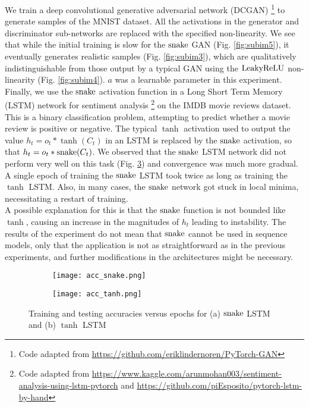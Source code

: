 We train a deep convolutional generative adversarial network (DCGAN) \footnote{Code adapted from \url{https://github.com/eriklindernoren/PyTorch-GAN}} \cite{radford2016unsupervised} to generate samples of the MNIST dataset. All the activations in the generator and discriminator sub-networks are replaced with the specified non-linearity. We see that while the initial training is slow for the $ \operatorname{snake} $ GAN (Fig. \ref{fig:subim5}), it eventually generates realistic samples (Fig. \ref{fig:subim3}), which are qualitatively indistinguishable from those output by a typical GAN using the $ \operatorname{LeakyReLU} $ non-linearity (Fig. \ref{fig:subim4}). $a$ was a learnable parameter in this experiment. \\

Finally, we use the $ \operatorname{snake} $ activation function in a Long Short Term Memory (LSTM) network for sentiment analysis 
\footnote{Code adapted from \url{https://www.kaggle.com/arunmohan003/sentiment-analysis-using-lstm-pytorch} and \url{https://github.com/piEsposito/pytorch-lstm-by-hand}} 
on the IMDB movie reviews dataset. 
This is a binary classification problem, attempting to predict whether a movie review is positive or negative. The typical $ \tanh $ activation used to output the value $ h_{t} = o_{t} * \tanh(C_t) $ in an LSTM is replaced by the $ \operatorname{snake} $ activation, so that $h_{t} = o_{t} * \operatorname{snake}(C_{t})$. 
We observed that the $ \operatorname{snake} $ LSTM network did not perform very well on this task (Fig. \ref{fig:lstm_acc}) and convergence was much more gradual. A single epoch of training the $ \operatorname{snake} $ LSTM took twice as long as training the $ \tanh $ LSTM.  Also, in many cases, the $ \operatorname{snake} $ network got stuck in local minima, necessitating a restart of training. \\

A possible explanation for this is that the $ \operatorname{snake} $ function is not bounded like $ \tanh $, causing an increase in the magnitudes of $ h_{t} $ leading to instability. The results of the experiment do not mean that $ \operatorname{snake} $ cannot be used in sequence models, only that the application is not as straightforward as in the previous experiments, and further modifications in the architectures might be necessary. 

\begin{figure}[h]
  \centering
  \begin{subfigure}{0.45\textwidth}
    \centering
    \texttt{[image: acc\_snake.png]} 
    \caption{}
    \label{fig:subim8}
  \end{subfigure}
  \begin{subfigure}{0.45\textwidth}
    \centering
    \texttt{[image: acc\_tanh.png]}
    \caption{}
    \label{fig:subim9}
  \end{subfigure}
  \caption{Training and testing accuracies versus epochs for (a) $ \operatorname{snake} $ LSTM and (b) $ \tanh $ LSTM}
  \label{fig:lstm_acc}
\end{figure}


